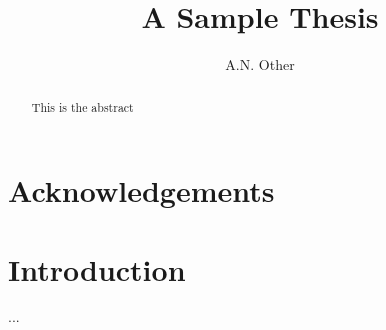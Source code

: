 \documentclass{scrreprt}
\title{A Sample Thesis}
\author{A.N. Other}
\begin{document}
\maketitle
{}
\tableofcontents
\chapter*{Acknowledgements}
\begin{abstract}
This is the abstract
\end{abstract}
\chapter{Introduction}
...
\end{document}
